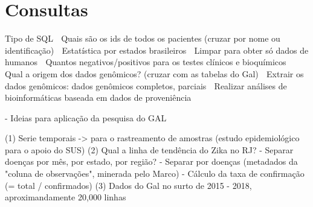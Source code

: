\chapter{Consultas}
Tipo de SQL		Quais são os ids de todos os pacientes (cruzar por nome ou identificação)
	Estatística por estados brasileiros
	Limpar para obter só dados de humanos
	Quantos negativos/positivos para os testes clínicos e bioquímicos
	Qual a origem dos dados genômicos? (cruzar com as tabelas do Gal)
	Extrair os dados genômicos: dados genômicos completos, parciais
	Realizar análises de bioinformáticas baseada em dados de proveniência


- Ideias para aplicação da pesquisa do GAL

	(1) Serie temporais -> para o rastreamento de amostras (estudo epidemiológico para o apoio do SUS)
	(2) Qual a linha de tendência do Zika no RJ? 
		- Separar doenças por mês, por estado, por região?
		- Separar por doenças (metadados da "coluna de observações", minerada pelo Marco)
		- Cálculo da taxa de confirmação (= total / confirmados)
	(3) Dados do Gal no surto de 2015 - 2018, aproximandamente 20,000 linhas

